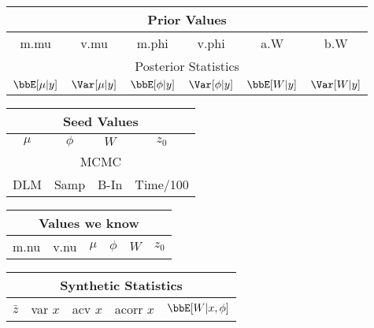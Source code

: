 \begin{tabular}{| c | c | c | c | c | c|}
\hline
\multicolumn{6}{|c|}{Prior Values} \\
\hline
m.mu & v.mu & m.phi & v.phi & a.W & b.W \\
\hline
\hline
\multicolumn{6}{|c|}{Posterior Statistics} \\
\hline
$\bbE[\mu|y]$ & $\Var[\mu|y]$ & 
$\bbE[\phi|y]$ & $\Var[\phi|y]$ & 
$\bbE[W|y]$ & $\Var[W|y]$ \\
\hline
\hline
\end{tabular}
%
\begin{tabular}{| c | c | c | c |}
\hline
\multicolumn{4}{|c|}{Seed Values} \\
\hline
$\mu$ & $\phi$ & $W$ & $z_0$ \\
\hline
\hline
\multicolumn{4}{|c|}{MCMC} \\
\hline
DLM & Samp & B-In & Time/100 \\
\hline
\hline
\end{tabular}

\vspace{3pt}

\begin{tabular}{| c | c | c | c | c | c |}
\hline
\multicolumn{6}{|c|}{Values we know} \\
\hline
m.nu & v.nu & $\mu$ & $\phi$ & $W$ & $z_0$ \\
\hline
\hline
\end{tabular}
%
\begin{tabular}{| c | c | c | c | c |}
\hline
\multicolumn{5}{|c|}{Synthetic Statistics} \\
\hline
$\bar z$ & var $x$ & acv $x$ & acorr $x$ & $\bbE[W|x,\phi]$ \\
\hline
\hline
\end{tabular}